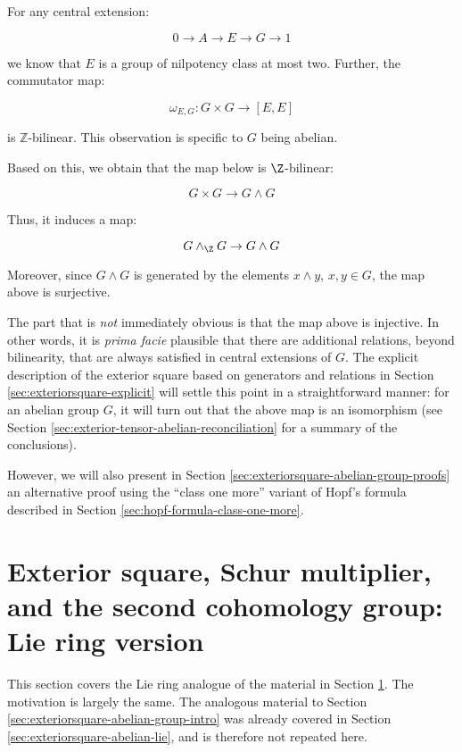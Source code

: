 \documentclass{ucetd}
\begin{document}
For any central extension:

$$0 \to A \to E \to G \to 1$$

we know that $E$ is a group of nilpotency class at most two. Further,
the commutator map:

$$\omega_{E,G}: G \times G \to [E,E]$$

is $\mathbb{Z}$-bilinear. This observation is specific to $G$ being
abelian. %

Based on this, we obtain that the map below is $\Z$-bilinear:

$$G \times G \to G \wedge G$$

Thus, it induces a map:

$$G \wedge_\Z G \to G \wedge G$$

Moreover, since $G \wedge G$ is generated by the elements $x \wedge
y$, $x,y \in G$, the map above is surjective.

The part that is {\em not} immediately obvious is that the map above
is injective. In other words, it is {\em prima facie} plausible that
there are additional relations, beyond bilinearity, that are always
satisfied in central extensions of $G$. The explicit description of
the exterior square based on generators and relations in Section
\ref{sec:exteriorsquare-explicit} will settle this point in a
straightforward manner: for an abelian group $G$, it will turn out
that the above map is an isomorphism (see Section
\ref{sec:exterior-tensor-abelian-reconciliation} for a summary of the
conclusions).

However, we will also present in Section
\ref{sec:exteriorsquare-abelian-group-proofs} an alternative proof
using the ``class one more'' variant of Hopf's formula described in
Section \ref{sec:hopf-formula-class-one-more}.

\section{Exterior square, Schur multiplier, and the second cohomology group: Lie ring version}\label{sec:schur-multiplier-and-second-cohomology-lie}

This section covers the Lie ring analogue of the material in Section
\ref{sec:schur-multiplier-and-second-cohomology-lie}. The motivation
is largely the same. The analogous material to Section
\ref{sec:exteriorsquare-abelian-group-intro} was already covered in
Section \ref{sec:exteriorsquare-abelian-lie}, and is therefore not
repeated here.
\end{document}
